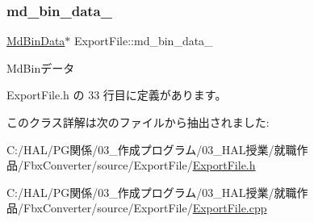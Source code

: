 \mbox{\label{class_export_file_a21c28c8b20e7c7592c9b31e4f316e446}} 
\subsubsection{\texorpdfstring{md\+\_\+bin\+\_\+data\+\_\+}{md\_bin\_data\_}}
{\footnotesize\ttfamily \mbox{\hyperlink{class_md_bin_data}{Md\+Bin\+Data}}$\ast$ Export\+File\+::md\+\_\+bin\+\_\+data\+\_\+\hspace{0.3cm}{\ttfamily [private]}}



Md\+Binデータ 



 Export\+File.\+h の 33 行目に定義があります。



このクラス詳解は次のファイルから抽出されました\+:\begin{DoxyCompactItemize}
\item 
C\+:/\+H\+A\+L/\+P\+G関係/03\+\_\+作成プログラム/03\+\_\+\+H\+A\+L授業/就職作品/\+Fbx\+Converter/source/\+Export\+File/\mbox{\hyperlink{_export_file_8h}{Export\+File.\+h}}\item 
C\+:/\+H\+A\+L/\+P\+G関係/03\+\_\+作成プログラム/03\+\_\+\+H\+A\+L授業/就職作品/\+Fbx\+Converter/source/\+Export\+File/\mbox{\hyperlink{_export_file_8cpp}{Export\+File.\+cpp}}\end{DoxyCompactItemize}
